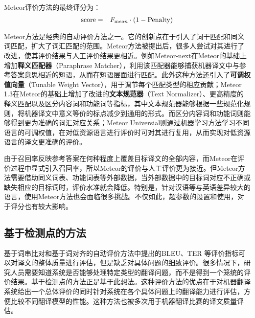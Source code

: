 \parinterval Meteor评价方法的最终评分为：
\begin{eqnarray}
\textrm {score} &=& { F_{\textrm mean}} \cdot {(1 - \textrm {Penalty})}
\label{eq:4-12}
\end{eqnarray}

\parinterval Meteor方法是经典的自动评价方法之一。它的创新点在于引入了词干匹配和同义词匹配，扩大了词汇匹配的范围。Meteor方法被提出后，很多人尝试对其进行了改进，使其评价结果与人工评价结果更相近。例如Meteor-next在Meteor的基础上增加{\small\sffamily\bfseries{释义匹配器}}（Paraphrase Matcher），利用该匹配器能够捕获机器译文中与参考答案意思相近的短语，从而在短语层面进行匹配。此外这种方法还引入了{\small\sffamily\bfseries{可调权值向量}}（Tunable Weight Vector），用于调节每个匹配类型的相应贡献；Meteor 1.3在Meteor的基础上增加了改进的{\small\sffamily\bfseries{文本规范器}}（Text Normalizer）、更高精度的释义匹配以及区分内容词和功能词等指标，其中文本规范器能够根据一些规范化规则，将机器译文中意义等价的标点减少到通用的形式。而区分内容词和功能词则能够得到更为准确的词汇对应关系；Meteor Universial则通过机器学习方法学习不同语言的可调权值，在对低资源语言进行评价时可对其进行复用，从而实现对低资源语言的译文更准确的评价。

\parinterval 由于召回率反映参考答案在何种程度上覆盖目标译文的全部内容，而Meteor在评价过程中显式引入召回率，所以Meteor的评价与人工评价更为接近。但Meteor方法需要借助同义词表、功能词表等外部数据，当外部数据中的目标词对应不正确或缺失相应的目标词时，评价水准就会降低。特别是，针对汉语等与英语差异较大的语言，使用Meteor方法也会面临很多挑战。不仅如此，超参数的设置和使用，对于评分也有较大影响。


\subsection{基于检测点的方法}

\parinterval 基于词串比对和基于词对齐的自动评价方法中提出的BLEU、TER 等评价指标可以对译文的整体质量进行评估，但是缺乏对具体问题的细致评价。很多情况下，研究人员需要知道系统是否能够处理特定类型的翻译问题，而不是得到一个笼统的评价结果。基于检测点的方法正是基于此想法。这种评价方法的优点在于对机器翻译系统给出一个总体评价的同时针对系统在各个具体问题上的翻译能力进行评估，方便比较不同翻译模型的性能。这种方法也被多次用于机器翻译比赛的译文质量评估。


